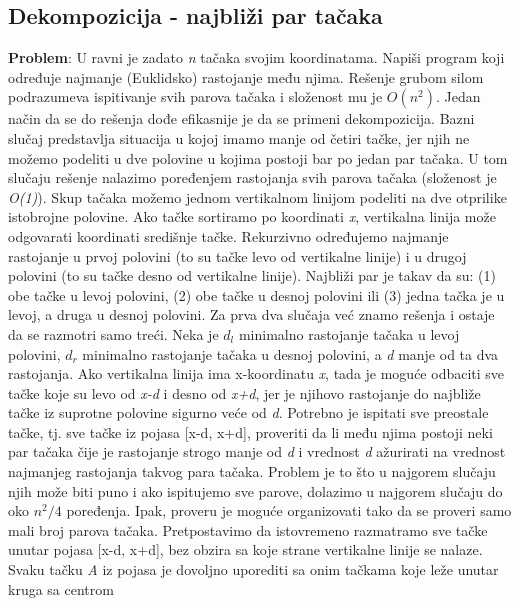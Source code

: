 \documentclass{article}
\begin{document}
\subsection{Dekompozicija - najbliži par tačaka}
\textbf{Problem}: U ravni je zadato \textit{n} tačaka svojim koordinatama. Napiši program
koji određuje najmanje (Euklidsko) rastojanje među njima.
\newline
Rešenje grubom silom podrazumeva ispitivanje svih parova tačaka i složenost mu je $O(n^2)$.
\newline
Jedan način da se do rešenja dođe efikasnije je da se primeni dekompozicija.
Bazni slučaj predstavlja situacija u kojoj imamo manje od četiri tačke, jer njih
ne možemo podeliti u dve polovine u kojima postoji bar po jedan par tačaka. U
tom slučaju rešenje nalazimo poređenjem rastojanja svih parova tačaka (složenost je \textit{O(1)}). Skup tačaka možemo jednom vertikalnom linijom podeliti na dve otprilike
istobrojne polovine. Ako tačke sortiramo po koordinati \textit{x}, vertikalna linija
može odgovarati koordinati središnje tačke. Rekurzivno određujemo najmanje
rastojanje u prvoj polovini (to su tačke levo od vertikalne linije) i u drugoj
polovini (to su tačke desno od vertikalne linije). Najbliži par je takav da su: (1)
obe tačke u levoj polovini, (2) obe tačke u desnoj polovini ili (3) jedna tačka je u
levoj, a druga u desnoj polovini. Za prva dva slučaja već znamo rešenja i ostaje
da se razmotri samo treći.
\newline
Neka je $d_l$ minimalno rastojanje tačaka u levoj polovini, $d_r$ minimalno rastojanje
tačaka u desnoj polovini, a \textit{d} manje od ta dva rastojanja. Ako vertikalna linija
ima x-koordinatu \textit{x}, tada je moguće odbaciti sve tačke koje su levo od \textit{x-d} i
desno od \textit{x+d}, jer je njihovo rastojanje do najbliže tačke iz suprotne polovine
sigurno veće od \textit{d}. Potrebno je ispitati sve preostale tačke, tj. sve tačke iz pojasa
[x-d, x+d], proveriti da li među njima postoji neki par tačaka čije je rastojanje
strogo manje od \textit{d} i vrednost \textit{d} ažurirati na vrednost najmanjeg rastojanja takvog
para tačaka. Problem je to što u najgorem slučaju njih može biti puno i ako ispitujemo sve parove, dolazimo
u najgorem slučaju do oko $n^2/4$ poređenja. Ipak, proveru je moguće organizovati tako da se proveri samo
mali broj parova tačaka.
\newline
Pretpostavimo da istovremeno razmatramo sve tačke
unutar pojasa [x-d, x+d], bez obzira sa koje strane vertikalne linije se nalaze. Svaku tačku \textit{A} iz
pojasa je dovoljno uporediti sa onim tačkama koje leže unutar kruga sa centrom
\end{document}
